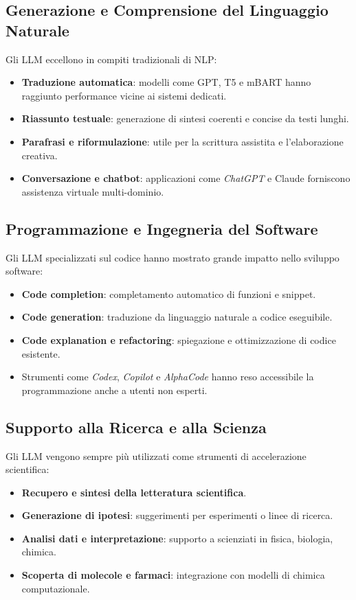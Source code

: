 \subsection{Generazione e Comprensione del Linguaggio Naturale}
Gli LLM eccellono in compiti tradizionali di NLP:
\begin{itemize}
    \item \textbf{Traduzione automatica}: modelli come GPT, T5 e mBART hanno raggiunto 
    performance vicine ai sistemi dedicati.
    \item \textbf{Riassunto testuale}: generazione di sintesi coerenti e concise da testi lunghi.
    \item \textbf{Parafrasi e riformulazione}: utile per la scrittura assistita e l'elaborazione creativa.
    \item \textbf{Conversazione e chatbot}: applicazioni come \textit{ChatGPT} e Claude 
    forniscono assistenza virtuale multi-dominio.
\end{itemize}

\subsection{Programmazione e Ingegneria del Software}
Gli LLM specializzati sul codice hanno mostrato grande impatto nello sviluppo software:
\begin{itemize}
    \item \textbf{Code completion}: completamento automatico di funzioni e snippet.
    \item \textbf{Code generation}: traduzione da linguaggio naturale a codice eseguibile.
    \item \textbf{Code explanation e refactoring}: spiegazione e ottimizzazione di codice esistente.
    \item Strumenti come \textit{Codex}, \textit{Copilot} e \textit{AlphaCode} hanno reso accessibile 
    la programmazione anche a utenti non esperti.
\end{itemize}

\subsection{Supporto alla Ricerca e alla Scienza}
Gli LLM vengono sempre più utilizzati come strumenti di accelerazione scientifica:
\begin{itemize}
    \item \textbf{Recupero e sintesi della letteratura scientifica}.
    \item \textbf{Generazione di ipotesi}: suggerimenti per esperimenti o linee di ricerca.
    \item \textbf{Analisi dati e interpretazione}: supporto a scienziati in fisica, biologia, chimica.
    \item \textbf{Scoperta di molecole e farmaci}: integrazione con modelli di chimica computazionale.
\end{itemize}

